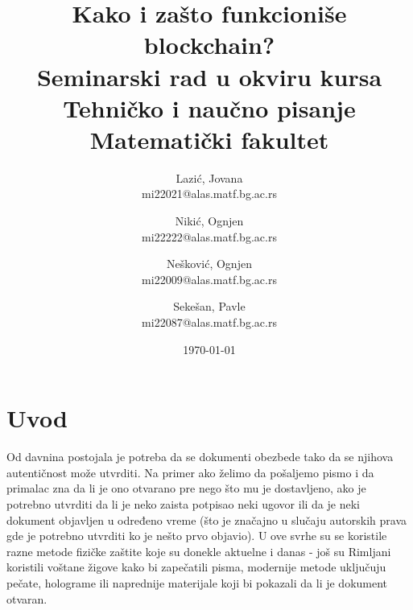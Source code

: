 \documentclass[a4paper]{article}
\begin{document}
\title{Kako i zašto funkcioniše blockchain?\\ \small{Seminarski rad u okviru kursa\\Tehničko i naučno pisanje\\ Matematički fakultet}}
\author{
    Lazić, Jovana\\ 
    mi22021@alas.matf.bg.ac.rs
    \and
    Nikić, Ognjen\\ 
    mi22222@alas.matf.bg.ac.rs
    \and
    Nešković, Ognjen\\ 
    mi22009@alas.matf.bg.ac.rs
    \and
    Sekešan, Pavle\\ 
    mi22087@alas.matf.bg.ac.rs
}
\date{\today}
\maketitle

\tableofcontents

\newpage

\section{Uvod}
\label{sec:uvod}
Od davnina postojala je potreba da se dokumenti obezbede tako da se njihova autentičnost 
može utvrditi. Na primer ako želimo da pošaljemo pismo i da primalac zna da li je ono 
otvarano pre nego što mu je dostavljeno, ako je potrebno utvrditi da li je neko zaista 
potpisao neki ugovor ili da je neki dokument objavljen u određeno vreme (što je značajno
u slučaju autorskih prava gde je potrebno utvrditi ko je nešto prvo objavio).
U ove svrhe su se koristile razne metode fizičke zaštite koje su donekle aktuelne i danas -
još su Rimljani koristili voštane žigove kako bi zapečatili pisma, modernije metode uključuju
pečate, holograme ili naprednije materijale koji bi pokazali da li je dokument otvaran.
\end{document}
